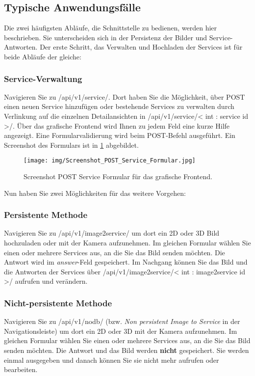 \subsection{Typische Anwendungsfälle}
Die zwei häufigsten Abläufe, die Schnittstelle zu bedienen, werden hier beschrieben. Sie unterscheiden sich in der Persistenz der Bilder und Service-Antworten. Der erste Schritt, das Verwalten und Hochladen der Services ist für beide Abläufe der gleiche:
\subsubsection{Service-Verwaltung}
Navigieren Sie zu /api/v1/service/. Dort haben Sie die Möglichkeit, über POST einen neuen Service hinzufügen oder bestehende Services zu verwalten durch Verlinkung auf die einzelnen Detailansichten in /api/v1/service/< int : service id >/. Über das grafische Frontend wird Ihnen zu jedem Feld eine kurze Hilfe angezeigt. Eine Formularvalidierung wird beim POST-Befehl ausgeführt. Ein Screenshot des Formulars ist in \ref{fig:postservice} abgebildet.
\begin{figure}[H]
    \centering
    \texttt{[image: img/Screenshot\_POST\_Service\_Formular.jpg]}
    \caption{Screenshot POST Service Formular für das grafische Frontend.}
    \label{fig:postservice}
\end{figure}
Nun haben Sie zwei Möglichkeiten für das weitere Vorgehen:
\subsubsection{Persistente Methode}
Navigieren Sie zu /api/v1/image2service/ um dort ein 2D oder 3D Bild hochzuladen oder mit der Kamera aufzunehmen. Im gleichen Formular wählen Sie einen oder mehrere Services aus, an die Sie das Bild senden möchten. Die Antwort wird im \emph{answer}-Feld gespeichert. Im Nachgang können Sie das Bild und die Antworten der Services über /api/v1/image2service/< int : image2service id >/ aufrufen und verändern.
\subsubsection{Nicht-persistente Methode}
Navigieren Sie zu /api/v1/nodb/ (bzw. \emph{Non persistent Image to Service} in der Navigationsleiste) um dort ein 2D oder 3D mit der Kamera aufzunehmen. Im gleichen Formular wählen Sie einen oder mehrere Services aus, an die Sie das Bild senden möchten. Die Antwort und das Bild werden \textbf{nicht} gespeichert. Sie werden einmal ausgegeben und danach können Sie sie nicht mehr aufrufen oder bearbeiten.

